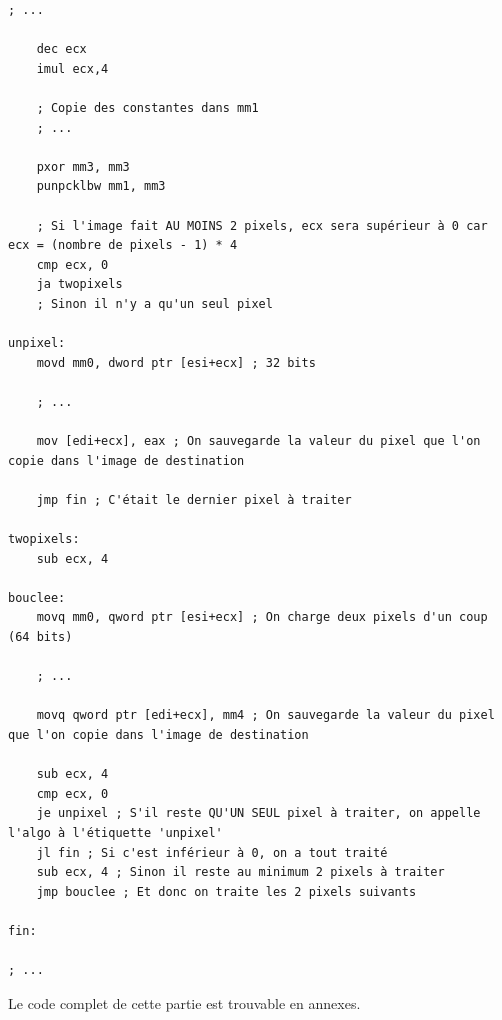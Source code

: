 \begin{lstlisting}
; ...

    dec ecx
    imul ecx,4

    ; Copie des constantes dans mm1
    ; ...

    pxor mm3, mm3
    punpcklbw mm1, mm3

    ; Si l'image fait AU MOINS 2 pixels, ecx sera supérieur à 0 car ecx = (nombre de pixels - 1) * 4
    cmp ecx, 0
    ja twopixels
    ; Sinon il n'y a qu'un seul pixel

unpixel:
    movd mm0, dword ptr [esi+ecx] ; 32 bits

    ; ...

    mov [edi+ecx], eax ; On sauvegarde la valeur du pixel que l'on copie dans l'image de destination

    jmp fin ; C'était le dernier pixel à traiter

twopixels:
    sub ecx, 4

bouclee:
    movq mm0, qword ptr [esi+ecx] ; On charge deux pixels d'un coup (64 bits)

    ; ...

    movq qword ptr [edi+ecx], mm4 ; On sauvegarde la valeur du pixel que l'on copie dans l'image de destination

    sub ecx, 4
    cmp ecx, 0
    je unpixel ; S'il reste QU'UN SEUL pixel à traiter, on appelle l'algo à l'étiquette 'unpixel'
    jl fin ; Si c'est inférieur à 0, on a tout traité
    sub ecx, 4 ; Sinon il reste au minimum 2 pixels à traiter
    jmp bouclee ; Et donc on traite les 2 pixels suivants

fin:

; ...
\end{lstlisting}

\noindent Le code complet de cette partie est trouvable en annexes.